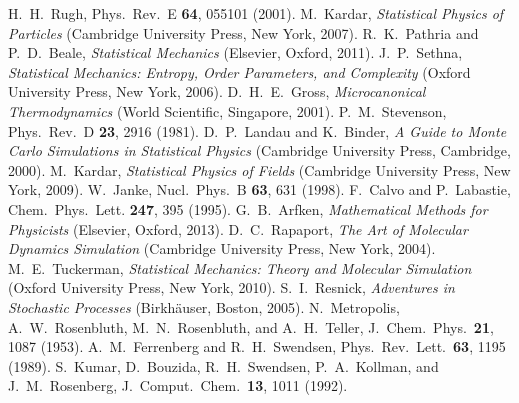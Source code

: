 %
H.~H.~Rugh, Phys.\ Rev.~E \textbf{64},
055101 (2001).
%
%
M.~Kardar, \emph{Statistical Physics of Particles} (Cambridge University Press, New York, 2007).
%
R.~K.~Pathria and P.~D.~Beale, \emph{Statistical Mechanics} (Elsevier, Oxford, 2011).
%
J.~P.~Sethna, \emph{Statistical Mechanics: Entropy, Order Parameters, and Complexity} (Oxford University Press, New York, 2006).
%
%
D.~H.~E.~Gross, \emph{Microcanonical Thermodynamics} (World Scientific, Singapore,  2001).
%
P.~M.~Stevenson, Phys.\ Rev.~D \textbf{23}, 2916 (1981).
%
%
D.~P.\ Landau and K.~Binder, \emph{A Guide to Monte Carlo Simulations in Statistical Physics} (Cambridge University Press, Cambridge, 2000).
%
M.~Kardar, \emph{Statistical Physics of Fields} (Cambridge University Press, New York, 2009).
%
W.~Janke, Nucl.\ Phys.~B \textbf{63}, 631 (1998).
%
F.~Calvo and P.~Labastie,  Chem.\ Phys.\ Lett. \textbf{247}, 395 (1995).
%
G.~B.~Arfken, \emph{Mathematical Methods for Physicists} (Elsevier, Oxford, 2013).
%
%
D.~C.~Rapaport,  \emph{The Art of Molecular Dynamics Simulation}  (Cambridge University Press, New York,
2004).
M.~E.~Tuckerman, \emph{Statistical Mechanics: Theory and Molecular Simulation} (Oxford University Press, New York, 2010).
%
%
S.~I.~Resnick, \emph{Adventures in Stochastic Processes} (Birkh{\"a}user, Boston, 2005).
%
%
N.~Metropolis, A.~W.~Rosenbluth, M.~N.~Rosenbluth, and A.~H.~Teller,   J.~Chem.\ Phys.\
\textbf{21}, 1087 (1953).
%
%
A.~M.\ Ferrenberg and R.~H.\ Swendsen, Phys.\ Rev.\ Lett.\
\textbf{63}, 1195 (1989).
%
S.~Kumar, D.~Bouzida, R.~H.\ Swendsen, P.~A.\ Kollman, and
J.~M.\ Rosenberg, J.~Comput.\ Chem.\ \textbf{13}, 1011 (1992).
